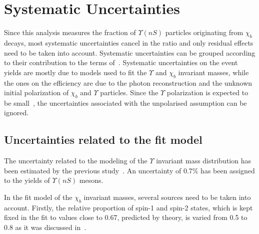 \section[Systematic]{Systematic Uncertainties}
\label{sec:syst}

Since this analysis measures the fraction of $\Upsilon(nS)$ particles
originating from $\chi_b$ decays, most systematic uncertainties cancel in the
ratio and only residual effects need to be taken into account. Systematic
uncertainties can be grouped according to their contribution to the terms
of~. Systematic uncertainties on the event yields are mostly
due to models used to fit the $\Upsilon$ and $\chi_b$ invariant masses, while
the ones on the efficiency are due to the photon reconstruction and the unknown
initial polarization of $\chi_b$ and $\Upsilon$ particles. Since the $\Upsilon$
polarization is expected to be small~\cite{Aaij:2013yaa,Aaij:2014nwa}, the
uncertainties associated with the unpolarised assumption can be ignored. 
 

\subsection{Uncertainties related to the fit model}

 
% 



The uncertainty related to the modeling of the $\Upsilon$ invariant mass
distribution has been estimated by the previous
study~\cite{Aaij:2013yaa}. An uncertainty of 0.7\% has been assigned to the
yields of $\Upsilon(nS)$ mesons.

In the fit model of the $\chi_b$ invariant masses, several sources need to be
taken into account. Firstly, the relative proportion of spin-1 and spin-2
states, which is kept fixed in the fit to values close to 0.67, predicted by
theory, is varied from 0.5 to 0.8 as it was discussed in~.


